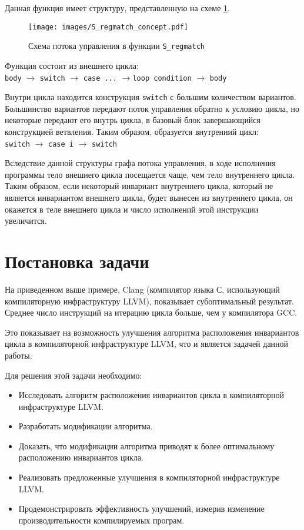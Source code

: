 Данная функция имеет структуру, представленную на схеме \ref{fig:S_regmatch_concept}.
\begin{figure}
    \centering
    \texttt{[image: images/S\_regmatch\_concept.pdf]}
    \caption{Схема потока управления в функции \texttt{S\_regmatch}}
    \label{fig:S_regmatch_concept}
\end{figure}

Функция состоит из внешнего цикла:
\\\texttt{body} $\rightarrow$ \texttt{switch} $\rightarrow$ \texttt{case ...} $\rightarrow$\texttt{loop condition} $\rightarrow$ \texttt{body}

Внутри цикла находится конструкция \texttt{switch} с большим количеством вариантов.
Большинство вариантов передают поток управления обратно к условию цикла, но некоторые передают его внутрь цикла, в базовый блок завершающийся конструкцией ветвления.
Таким образом, образуется внутренний цикл:
\\\texttt{switch} $\rightarrow$ \texttt{case i} $\rightarrow$ \texttt{switch}

Вследствие данной структуры графа потока управления, в ходе исполнения программы тело внешнего цикла посещается чаще, чем тело внутреннего цикла.
Таким образом, если некоторый инвариант внутреннего цикла, который не является инвариантом внешнего цикла, будет вынесен из внутреннего цикла, он окажется в теле внешнего цикла и число исполнений этой инструкции увеличится.

\section*{Постановка задачи}

На приведенном выше примере, Clang (компилятор языка С, использующий компиляторную инфраструктуру LLVM), показывает субоптимальный результат.
Среднее число инструкций на итерацию цикла больше, чем у компилятора GCC.

Это показывает на возможность улучшения алгоритма расположения инвариантов цикла в компиляторной инфраструктуре LLVM, что и является задачей данной работы.

Для решения этой задачи необходимо:
\begin{itemize}
    \item Исследовать алгоритм расположения инвариантов цикла в компиляторной инфраструктуре LLVM.
    \item Разработать модификации алгоритма.
    \item Доказать, что модификации алгоритма приводят к более оптимальному расположению инвариантов цикла.
    \item Реализовать предложенные улучшения в компиляторной инфраструктуре LLVM.
    \item Продемонстрировать эффективность улучшений, измерив изменение производительности компилируемых програм.
\end{itemize}

\newpage

